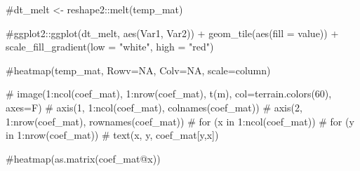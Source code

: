 \documentclass[
  letterpaper,
  DIV=11,
  numbers=noendperiod]{scrartcl}
\newenvironment{Shaded}{\begin{snugshade}}{\end{snugshade}}
\newcommand{\AttributeTok}[1]{\textcolor[rgb]{0.40,0.45,0.13}{#1}}
\newcommand{\CommentTok}[1]{\textcolor[rgb]{0.37,0.37,0.37}{#1}}
\newcommand{\FunctionTok}[1]{\textcolor[rgb]{0.28,0.35,0.67}{#1}}
\newcommand{\NormalTok}[1]{\textcolor[rgb]{0.00,0.23,0.31}{#1}}
\newcommand{\SpecialCharTok}[1]{\textcolor[rgb]{0.37,0.37,0.37}{#1}}
\newcommand{\StringTok}[1]{\textcolor[rgb]{0.13,0.47,0.30}{#1}}
\begin{document}
\begin{Shaded}
\begin{Highlighting}[]
\CommentTok{\#dt\_melt \textless{}{-} reshape2::melt(temp\_mat)}
\end{Highlighting}
\end{Shaded}

\begin{Shaded}
\begin{Highlighting}[]
\CommentTok{\#ggplot2::ggplot(dt\_melt, aes(Var1, Var2)) + geom\_tile(aes(fill = value)) + scale\_fill\_gradient(low = "white", high = "red")}
\end{Highlighting}
\end{Shaded}

\begin{Shaded}
\begin{Highlighting}[]
\CommentTok{\#heatmap(temp\_mat, Rowv=NA, Colv=NA, scale=\textquotesingle{}column\textquotesingle{})}
\end{Highlighting}
\end{Shaded}

\begin{Shaded}
\begin{Highlighting}[]
\CommentTok{\# image(1:ncol(coef\_mat), 1:nrow(coef\_mat), t(m), col=terrain.colors(60), axes=F)}
\CommentTok{\# axis(1, 1:ncol(coef\_mat), colnames(coef\_mat))}
\CommentTok{\# axis(2, 1:nrow(coef\_mat), rownames(coef\_mat))}
\CommentTok{\# for (x in 1:ncol(coef\_mat))}
\CommentTok{\#   for (y in 1:nrow(coef\_mat))}
\CommentTok{\#     text(x, y, coef\_mat[y,x])}
\end{Highlighting}
\end{Shaded}

\begin{Shaded}
\begin{Highlighting}[]
\CommentTok{\#heatmap(as.matrix(coef\_mat@x))}
\end{Highlighting}
\end{Shaded}

\begin{Shaded}
\end{Shaded}
\end{document}
